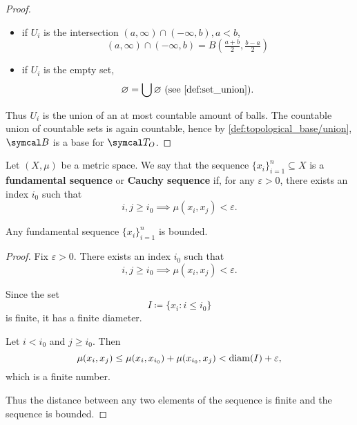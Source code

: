 \begin{proof}
\begin{itemize}
    \item if \( U_i \) is the intersection \( (a, \infty) \cap (-\infty, b), a < b \),
    \begin{equation*}
      (a, \infty) \cap (-\infty, b) = B(\tfrac {a + b} 2, \tfrac {b - a} 2)
    \end{equation*}

    \item if \( U_i \) is the empty set,
    \begin{equation*}
      \varnothing = \bigcup \varnothing \text{ (see \cref{def:set_union})}.
    \end{equation*}
  \end{itemize}

  Thus \( U_i \) is the union of an at most countable amount of balls. The countable union of countable sets is again countable, hence by \cref{def:topological_base/union}, \( \Cal{B} \) is a base for \( \Cal{T}_O \).
\end{proof}

\begin{definition}\label{def:fundamental_sequence}
  Let \( (X, \mu) \) be a metric space. We say that the sequence \( \{ x_i \}_{i=1}^n \subseteq X \) is a \textbf{fundamental sequence} or \textbf{Cauchy sequence} if, for any \( \varepsilon > 0 \), there exists an index \( i_0 \) such that
  \begin{equation*}
    i, j \geq i_0 \implies \mu(x_i, x_j) < \varepsilon.
  \end{equation*}
\end{definition}

\begin{proposition}\label{thm:fundamental_sequence_is_bounded}
  Any fundamental sequence \( \{ x_i \}_{i=1}^n \) is bounded.
\end{proposition}
\begin{proof}
  Fix \( \varepsilon > 0 \). There exists an index \( i_0 \) such that
  \begin{equation*}
    i, j \geq i_0 \implies \mu(x_i, x_j) < \varepsilon.
  \end{equation*}

  Since the set
  \begin{equation*}
    I \coloneqq \{ x_i \colon i \leq i_0 \}
  \end{equation*}
  is finite, it has a finite diameter.

  Let \( i < i_0 \) and \( j \geq i_0 \). Then
  \begin{equation*}
    \mu(x_i, x_j) \leq \mu(x_i, x_{i_0}) + \mu(x_{i_0}, x_j) < \operatorname{diam}(I) + \varepsilon,
  \end{equation*}
  which is a finite number.

  Thus the distance between any two elements of the sequence is finite and the sequence is bounded.
\end{proof}

